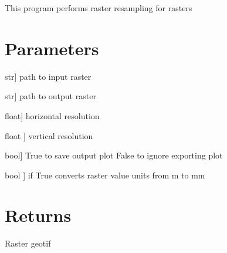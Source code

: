 \documentclass[letterpaper,10pt]{sphinxmanual}
\begin{document}
\begin{fulllineitems}
\label{\detokenize{generated/akhdefo_functions.Akhdefo_resample:akhdefo_functions.Akhdefo_resample}}
\pysigstartsignatures
{}
\pysigstopsignatures
\sphinxAtStartPar
This program performs raster resampling for  rasters


\section{Parameters}
\label{\detokenize{generated/akhdefo_functions.Akhdefo_resample:parameters}}\begin{description}
\sphinxlineitem{input\_raster}{[}str{]}
\sphinxAtStartPar
path to input raster

\sphinxlineitem{output\_raster}{[}str{]}
\sphinxAtStartPar
path to output raster

\sphinxlineitem{xres}{[}float{]}
\sphinxAtStartPar
horizontal resolution

\sphinxlineitem{yres}{[}float {]}
\sphinxAtStartPar
vertical resolution

\sphinxlineitem{SavFig}{[}bool{]}
\sphinxAtStartPar
True to save output plot False to ignore exporting plot

\sphinxlineitem{convert\_units}{[}bool {]}
\sphinxAtStartPar
if True converts raster value units from m to mm

\end{description}


\section{Returns}
\label{\detokenize{generated/akhdefo_functions.Akhdefo_resample:returns}}
\sphinxAtStartPar
Raster geotif

\end{fulllineitems}


\sphinxstepscope
\end{document}
